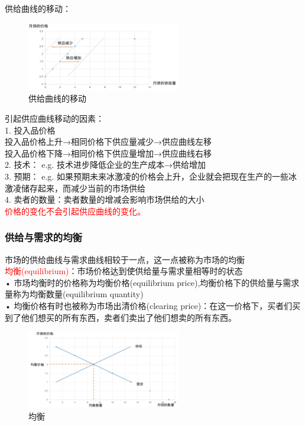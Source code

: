 \documentclass[12pt,a4paper]{article}
\begin{document}
供给曲线的移动：\\

\begin{figure}[H] 
  \centering %
  \includegraphics[width=0.6\textwidth]{供给曲线的移动.png} %
  \caption{供给曲线的移动} %
\end{figure}

引起供应曲线移动的因素：\\

1. 投入品价格\\
投入品价格上升→相同价格下供应量减少→供应曲线左移\\
投入品价格下降→相同价格下供应量增加→供应曲线右移\\

2. 技术： e.g. 技术进步降低企业的生产成本→供给增加\\

3. 预期： e.g. 如果预期未来冰激凌的价格会上升，企业就会把现在生产的一些冰激凌储存起来，而减少当前的市场供给\\

4. 卖者的数量：卖者数量的增减会影响市场供给的大小\\

\textcolor{red}{价格的变化不会引起供应曲线的变化。}\\

\subsubsection{供给与需求的均衡}
市场的供给曲线与需求曲线相较于一点，这一点被称为市场的均衡\\

\textcolor{red}{均衡(equilibrium)}：市场价格达到使供给量与需求量相等时的状态\\

\noindent• 市场均衡时的价格称为均衡价格(equilibrium price),均衡价格下的供给量与需求量称为均衡数量(equilibrium quantity)\\
• 均衡价格有时也被称为市场出清价格(clearing price)：在这一价格下，买者们买到了他们想买的所有东西，卖者们卖出了他们想卖的所有东西。
\begin{figure}[H] 
  \centering %
  \includegraphics[width=0.6\textwidth]{均衡.png} %
  \caption{均衡} %
  \label{fig:equilibrium} %
\end{figure}
\end{document}
